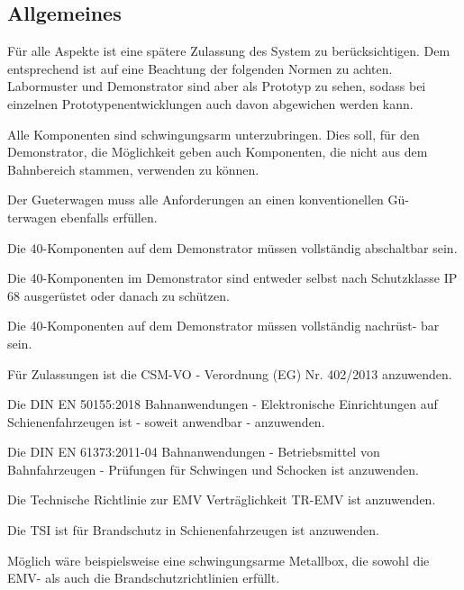 \subsection{Allgemeines}
Für alle Aspekte ist eine spätere Zulassung des System zu berücksichtigen. Dem entsprechend ist auf eine Beachtung der folgenden Normen zu achten. Labormuster und \gls{Demonstrator} sind aber als Prototyp zu sehen, sodass bei einzelnen Prototypenentwicklungen auch davon abgewichen werden kann. \par
Alle Komponenten sind schwingungsarm unterzubringen. Dies soll, für den Demonstrator, die Möglichkeit geben auch Komponenten, die nicht aus dem Bahnbereich stammen, verwenden zu können.
\begin{feat}
Der \gls{Gueterwagen} muss alle Anforderungen an einen konventionellen Gü- terwagen ebenfalls erfüllen.
\end{feat}
\begin{feat}
Die \gls{40-Komponenten} auf dem \gls{Demonstrator} müssen vollständig abschaltbar sein.
\end{feat}
\begin{feat}
Die \gls{40-Komponenten} im \gls{Demonstrator} sind entweder selbst nach Schutzklasse IP 68 ausgerüstet oder danach zu schützen.
\end{feat}
\begin{feat}
Die \gls{40-Komponenten} auf dem \gls{Demonstrator} müssen vollständig nachrüst- bar sein.
\end{feat}
\begin{feat}
Für Zulassungen ist die CSM-VO - Verordnung (EG) Nr. 402/2013 anzuwenden.
\end{feat}
\begin{feat}
Die \acrshort{DIN} \acrshort{EN} 50155:2018 Bahnanwendungen - Elektronische Einrichtungen auf Schienenfahrzeugen ist - soweit anwendbar - anzuwenden.
\end{feat}
\begin{feat}
Die \acrshort{DIN} \acrshort{EN} 61373:2011-04 Bahnanwendungen - Betriebsmittel von Bahnfahrzeugen - Prüfungen für Schwingen und Schocken ist anzuwenden.
\end{feat}
\begin{feat}
Die Technische Richtlinie zur EMV Verträglichkeit TR-EMV ist anzuwenden.
\end{feat}
\begin{feat}
Die TSI ist für Brandschutz in Schienenfahrzeugen ist anzuwenden.
\end{feat}
\begin{rem}[zu Anf. 6-8]
Möglich wäre beispielsweise eine schwingungsarme Metallbox, die sowohl die EMV- als auch die Brandschutzrichtlinien erfüllt.
\end{rem}

